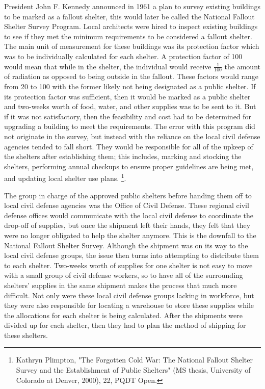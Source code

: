 \documentclass[12pt]{turabian-researchpaper}
\begin{document}
President John F. Kennedy announced in 1961 a plan to survey existing buildings to be marked as a fallout shelter, this would later be called the National Fallout Shelter Survey Program. Local architects were hired to inspect existing buildings to see if they met the minimum requirements to be considered a fallout shelter. The main unit of measurement for these buildings was its protection factor which was to be individually calculated for each shelter. A protection factor of 100 would mean that while in the shelter, the individual would receive $\frac{1}{100}$ the amount of radiation as opposed to being outside in the fallout. These factors would range from 20 to 100 with the former likely not being designated as a public shelter. If its protection factor was sufficient, then it would be marked as a public shelter and two-weeks worth of food, water, and other supplies was to be sent to it. But if it was not satisfactory, then the feasibility and cost had to be determined for upgrading a building to meet the requirements. The error with this program did not originate in the survey, but instead with the reliance on the local civil defense agencies tended to fall short. They would be responsible for all of the upkeep of the shelters after establishing them; this includes, marking and stocking the shelters, performing annual checkups to ensure proper guidelines are being met, and updating local shelter use plans. \footnote{Kathryn Plimpton, "The Forgotten Cold War: The National Fallout Shelter Survey and the Establishment of Public Shelters" (MS thesis, University of Colorado at Denver, 2000), 22, PQDT Open.}.

The group in charge of the approved public shelters before handing them off to local civil defense agencies was the Office of Civil Defense. These regional civil defense offices would communicate with the local civil defense to coordinate the drop-off of supplies, but once the shipment left their hands, they felt that they were no longer obligated to help the shelter anymore. This is the downfall to the National Fallout Shelter Survey. Although the shipment was on its way to the local civil defense groups, the issue then turns into attempting to distribute them to each shelter. Two-weeks worth of supplies for one shelter is not easy to move with a small group of civil defense workers, so to have all of the surrounding shelters' supplies in the same shipment makes the process that much more difficult. Not only were these local civil defense groups lacking in workforce, but they were also responsible for locating a warehouse to store these supplies while the allocations for each shelter is being calculated. After the shipments were divided up for each shelter, then they had to plan the method of shipping for these shelters.
\end{document}
